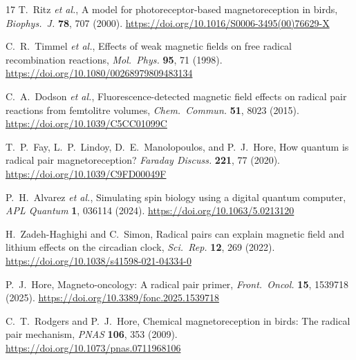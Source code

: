 \documentclass[preprint,amsmath,amssymb]{revtex4-2}
\begin{document}
\begin{thebibliography}{17}
T.~Ritz \emph{et al.}, A model for photoreceptor-based magnetoreception in birds, \emph{Biophys.\ J.} \textbf{78}, 707 (2000). \url{https://doi.org/10.1016/S0006-3495(00)76629-X}

C.~R.~Timmel \emph{et al.}, Effects of weak magnetic fields on free radical recombination reactions, \emph{Mol.\ Phys.} \textbf{95}, 71 (1998). \url{https://doi.org/10.1080/00268979809483134}

C.~A.~Dodson \emph{et al.}, Fluorescence-detected magnetic field effects on radical pair reactions from femtolitre volumes, \emph{Chem.\ Commun.} \textbf{51}, 8023 (2015). \url{https://doi.org/10.1039/C5CC01099C}

T.~P.~Fay, L.~P.~Lindoy, D.~E.~Manolopoulos, and P.~J.~Hore, How quantum is radical pair magnetoreception? \emph{Faraday Discuss.} \textbf{221}, 77 (2020). \url{https://doi.org/10.1039/C9FD00049F}

P.~H.~Alvarez \emph{et al.}, Simulating spin biology using a digital quantum computer, \emph{APL Quantum} \textbf{1}, 036114 (2024). \url{https://doi.org/10.1063/5.0213120}

H.~Zadeh-Haghighi and C.~Simon, Radical pairs can explain magnetic field and lithium effects on the circadian clock, \emph{Sci.\ Rep.} \textbf{12}, 269 (2022). \url{https://doi.org/10.1038/s41598-021-04334-0}

P.~J.~Hore, Magneto-oncology: A radical pair primer, \emph{Front.\ Oncol.} \textbf{15}, 1539718 (2025). \url{https://doi.org/10.3389/fonc.2025.1539718}

C.~T.~Rodgers and P.~J.~Hore, Chemical magnetoreception in birds: The radical pair mechanism, \emph{PNAS} \textbf{106}, 353 (2009). \url{https://doi.org/10.1073/pnas.0711968106}

\end{thebibliography}
\end{document}
